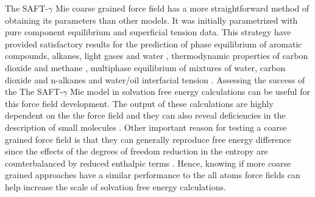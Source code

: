The SAFT-$\gamma$ Mie coarse grained force field has a more straightforward method of obtaining its parameters than other models. It was initially parametrized with pure component equilibrium and superficial tension data. This strategy have provided satisfactory results for the prediction of phase equilibrium of aromatic compounds, alkanes, light gases and water \cite{herdes2015,muller2017,lobanova2015} , thermodynamic properties of carbon dioxide and methane \cite{cassiano}, multiphase equilibrium of mixtures of water, carbon dioxide and n-alkanes \cite{lobanova2016} and water/oil interfacial tension \cite{herdes2017}. Assessing the success of the The SAFT-$\gamma$ Mie model in solvation free energy calculations can be useful for this force field development. The output of these calculations are highly dependent on the the force field and they can also reveal deficiencies in the description of small molecules \cite{mobley2007,shirts2013}. Other important reason for testing a coarse grained force field is that they can generally reproduce free energy difference since the effects of the degrees of freedom reduction  in the entropy are counterbalanced by reduced enthalpic terms \cite{kmiecik2016}. Hence, knowing if more coarse grained approaches have a similar performance to the all atoms force fields can help increase the scale of solvation free energy calculations. 